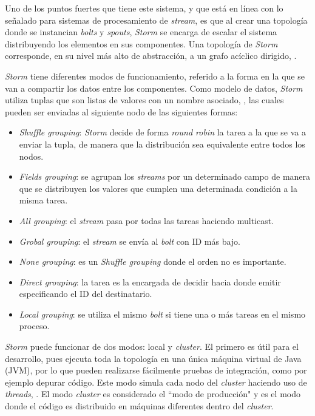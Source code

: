 Uno de los puntos fuertes que tiene este sistema, y que está en línea con lo señalado para sistemas de procesamiento de \textit{stream}, es que al crear una topología donde se instancian \textit{bolts} y \textit{spouts}, \textit{Storm} se encarga de escalar el sistema distribuyendo los elementos en sus componentes. Una topología de \textit{Storm} corresponde, en su nivel más alto de abstracción, a un grafo acíclico dirigido, \cite{Storm}.

\textit{Storm} tiene diferentes modos de funcionamiento, referido a la forma en la que se van a compartir los datos entre los componentes. Como modelo de datos, \textit{Storm} utiliza tuplas que son listas de valores con un nombre asociado, \cite{Storm}, las cuales pueden ser enviadas al siguiente nodo de las siguientes formas:

\begin{itemize}
\item \textit{Shuffle grouping}: \textit{Storm} decide de forma \textit{round robin} la tarea a la que se va a enviar la tupla, de manera que la distribución sea equivalente entre todos los nodos.
\item \textit{Fields grouping}: se agrupan los \textit{streams} por un determinado campo de manera que se distribuyen los valores que cumplen una determinada condición a la misma tarea.
\item \textit{All grouping}: el \textit{stream} pasa por todas las tareas haciendo multicast.
\item \textit{Grobal grouping}: el \textit{stream} se envía al \textit{bolt} con ID más bajo.
\item \textit{None grouping}: es un \textit{Shuffle grouping} donde el orden no es importante.
\item \textit{Direct grouping}: la tarea es la encargada de decidir hacia donde emitir especificando el ID del destinatario.
\item \textit{Local grouping}: se utiliza el mismo \textit{bolt} si tiene una o más tareas en el mismo proceso.
\end{itemize}

\textit{Storm} puede funcionar de dos modos: local y \textit{cluster}. El primero es útil para el desarrollo, pues ejecuta toda la topología en una única máquina virtual de Java (JVM), por lo que pueden realizarse fácilmente pruebas de integración, como por ejemplo depurar código. Este modo simula cada nodo del \textit{cluster} haciendo uso de \textit{threads}, \cite{Storm}. El modo \textit{cluster} es considerado el ``modo de producción" y es el modo donde el código es distribuido en máquinas diferentes dentro del \textit{cluster}.

